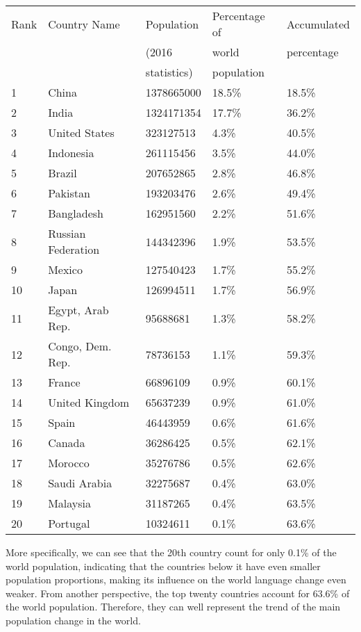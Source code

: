 \documentclass{mcmthesis}
\begin{document}
\begin{tabular}{|l|l|l|l|l|}
  \hline
  Rank & Country Name & Population & Percentage of & Accumulated\\  &  &  (2016  &  world  &  percentage \\  &  &statistics) & population &  \\ \hline
  1 & China & 1378665000 & 18.5\% & 18.5\% \\ \hline
 2 & India & 1324171354 & 17.7\% & 36.2\% \\  \hline
 3 & United States & 323127513 & 4.3\% & 40.5\% \\  \hline
  4 & Indonesia & 261115456 & 3.5\% & 44.0\%   \\  \hline
  5 & Brazil & 207652865 & 2.8\% & 46.8\% \\  \hline
  6 & Pakistan & 193203476 & 2.6\% & 49.4\% \\  \hline
  7 & Bangladesh & 162951560 & 2.2\% & 51.6\% \\  \hline
  8 & Russian Federation & 144342396 & 1.9\% &  53.5\%\\ \hline
  9 & Mexico & 127540423 & 1.7\% & 55.2\% \\ \hline
  10 & Japan & 126994511 & 1.7\% & 56.9\% \\ \hline
  11 & Egypt, Arab Rep. & 95688681 & 1.3\% & 58.2\% \\ \hline
  12 & Congo, Dem. Rep.  & 78736153 & 1.1\% & 59.3\% \\ \hline
  13 & France & 66896109 & 0.9\% & 60.1\% \\ \hline
  14 & United Kingdom & 65637239 & 0.9\% & 61.0\% \\ \hline
  15 & Spain & 46443959 & 0.6\% & 61.6\% \\ \hline
  16 & Canada & 36286425 & 0.5\% & 62.1\% \\ \hline
  17 & Morocco & 35276786 & 0.5\% & 62.6\% \\ \hline
  18 & Saudi Arabia & 32275687 & 0.4\% & 63.0\% \\ \hline
  19 & Malaysia & 31187265 & 0.4\% & 63.5\% \\ \hline
  20 & Portugal & 10324611 & 0.1\% & 63.6\% \\  \hline
\end{tabular}

More specifically, we can see that the 20th country count for only 0.1\% of the world population, indicating that the countries below it have even smaller population proportions, making its influence on the world language change even weaker. From another perspective, the top twenty countries account for 63.6\% of the world population. Therefore, they can well represent the trend of the main population change in the world.
\end{document}
